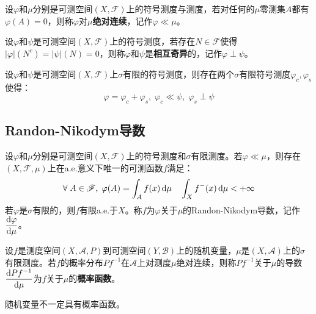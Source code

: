 \begin{definition}
	设$\varphi$和$\mu$分别是可测空间$(X,\mathscr{F})$上的符号测度与测度，若对任何的$\mu$零测集$A$都有$\varphi(A)=0$，则称$\varphi$对$\mu$\textbf{绝对连续}，记作$\varphi\ll\mu$。
\end{definition}
\begin{definition}
	设$\varphi$和$\psi$是可测空间$(X,\mathscr{F})$上的符号测度，若存在$N\in\mathscr{F}$使得$|\varphi|(N^c)=|\psi|(N)=0$，则称$\varphi$和$\psi$是\textbf{相互奇异}的，记作$\varphi\perp\psi$。
\end{definition}
\begin{theorem}
	设$\varphi$和$\psi$是可测空间$(X,\mathscr{F})$上$\sigma$有限的符号测度，则存在两个$\sigma$有限符号测度$\varphi_c,\varphi_s$使得：
	\begin{equation*}
		\varphi=\varphi_c+\varphi_s,\;\varphi_c\ll\psi,\;\varphi_s\perp\psi
	\end{equation*}
\end{theorem}

\subsection{Randon-Nikodym导数}
\begin{theorem}\label{theo:RandomNikodym}
	设$\varphi$和$\mu$分别是可测空间$(X,\mathscr{F})$上的符号测度和$\sigma$有限测度。若$\varphi\ll\mu$，则存在$(X,\mathscr{F},\mu)$上在a.e.意义下唯一的可测函数$f$满足：
	\begin{equation*}
		\forall\;A\in\mathscr{F},\;\varphi(A)=\int_{A}f(x)\mathop{}\!\mathrm{d}\mu\quad\int_{X}f^-(x)\mathop{}\!\mathrm{d}\mu<+\infty
	\end{equation*}
	若$\varphi$是$\sigma$有限的，则$f$有限a.e.于$X$。称$f$为$\varphi$关于$\mu$的Randon-Nikodym导数，记作$\dfrac{\mathop{}\!\mathrm{d}\varphi}{\mathop{}\!\mathrm{d}\mu}$。
\end{theorem}
\begin{definition}
	设$f$是测度空间$(X,\mathscr{A},P)$到可测空间$(Y,\mathscr{B})$上的随机变量，$\mu$是$(X,\mathscr{A})$上的$\sigma$有限测度。若$f$的概率分布$Pf^{-1}$在$\mathscr{A}$上对测度$\mu$绝对连续，则称$Pf^{-1}$关于$\mu$的导数$\dfrac{\mathop{}\!\mathrm{d} Pf^{-1}}{\mathop{}\!\mathrm{d}\mu}$为$f$关于$\mu$的\textbf{概率函数}。
\end{definition}
\begin{note}
	随机变量不一定具有概率函数。
\end{note}

